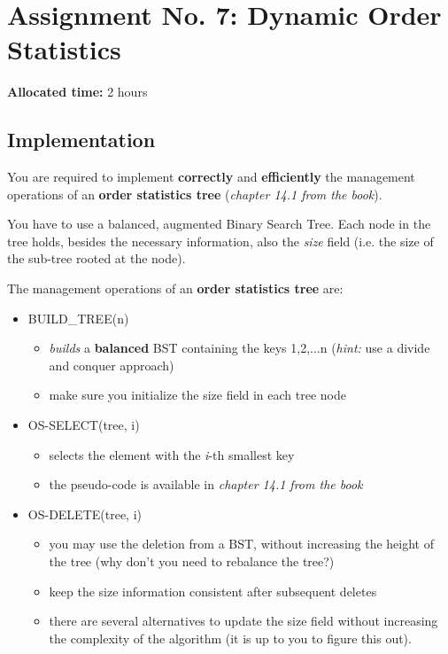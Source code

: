 \documentclass[../en-fa-lab.tex]{subfiles}
\begin{document}
\section{\texorpdfstring{\textbf{Assignment No. 7: Dynamic Order Statistics}}{Assignment No. 7: Dynamic Order Statistics}}\label{assign7}

\textbf{Allocated time:} 2 hours

\subsection{Implementation}\label{implementation}

You are required to implement \textbf{correctly} and
\textbf{efficiently} the management operations of an \textbf{order
statistics tree} (\emph{chapter 14.1 from the book\citep{cormen}}).

You have to use a balanced, augmented Binary Search Tree. Each node in
the tree holds, besides the necessary information, also the \emph{size}
field (i.e. the size of the sub-tree rooted at the node).

The management operations of an \textbf{order statistics tree} are:

\begin{itemize}
\item
  BUILD\_TREE(n)

  \begin{itemize}
  \item
    \emph{builds} a \textbf{balanced} BST containing the keys 1,2,...n
    (\emph{hint:} use a divide and conquer approach)
  \item
    make sure you initialize the size field in each tree node
  \end{itemize}
\item
  OS-SELECT(tree, i)

  \begin{itemize}
  \item
    selects the element with the \emph{i}-th smallest key
  \item
    the pseudo-code is available in \emph{chapter 14.1 from the
    book\citep{cormen}}
  \end{itemize}
\item
  OS-DELETE(tree, i)

  \begin{itemize}
  \item
    you may use the deletion from a BST, without increasing the height
    of the tree (why don't you need to rebalance the tree?)
  \item
    keep the size information consistent after subsequent deletes
  \item
    there are several alternatives to update the size field without
    increasing the complexity of the algorithm (it is up to you to
    figure this out).
  \end{itemize}
\end{itemize}
\end{document}
